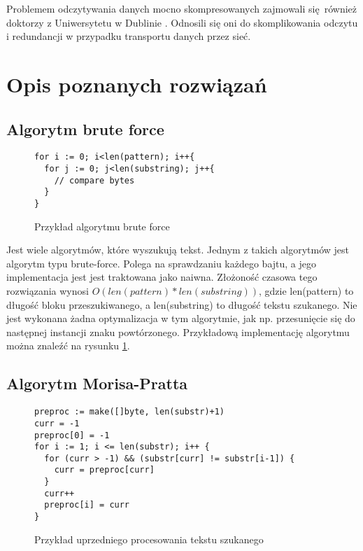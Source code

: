 Problemem odczytywania danych mocno skompresowanych zajmowali się również 
doktorzy z Uniwersytetu w Dublinie \cite{bib:internet:KompresjaDanych}. Odnosili
się oni do skomplikowania odczytu i redundancji w przypadku transportu danych
przez sieć.

\section{Opis poznanych rozwiązań}

\subsection{Algorytm brute force}

\begin{figure}[h]
  \centering
  \begin{lstlisting}
for i := 0; i<len(pattern); i++{
  for j := 0; j<len(substring); j++{
    // compare bytes
  }
}
  \end{lstlisting}
  \caption{Przykład algorytmu brute force}
  \label{fig:code:bruteForceComparison}
\end{figure}

Jest wiele algorytmów, które wyszukują tekst. Jednym z takich algorytmów jest 
algorytm typu brute-force. Polega na sprawdzaniu każdego bajtu, a jego implementacja
jest jest traktowana jako naiwna. Złożoność czasowa tego rozwiązania wynosi
$O(len(pattern) * len(substring))$, gdzie len(pattern) to długość bloku 
przeszukiwanego, a len(substring) to długość tekstu szukanego. Nie jest wykonana
żadna optymalizacja w tym algorytmie, jak np. przesunięcie się do następnej
 instancji znaku powtórzonego. Przykładową implementację algorytmu można znaleźć
  na rysunku \ref{fig:code:bruteForceComparison}.


\subsection{Algorytm Morisa-Pratta}

\begin{figure}[h]
  \centering
  \begin{lstlisting}
preproc := make([]byte, len(substr)+1)
curr = -1
preproc[0] = -1
for i := 1; i <= len(substr); i++ {
  for (curr > -1) && (substr[curr] != substr[i-1]) {
    curr = preproc[curr]
  }
  curr++
  preproc[i] = curr
}
  \end{lstlisting}
  \caption{Przykład uprzedniego procesowania tekstu szukanego}
  \label{fig:code:preprocessMorisPratt}
\end{figure}

